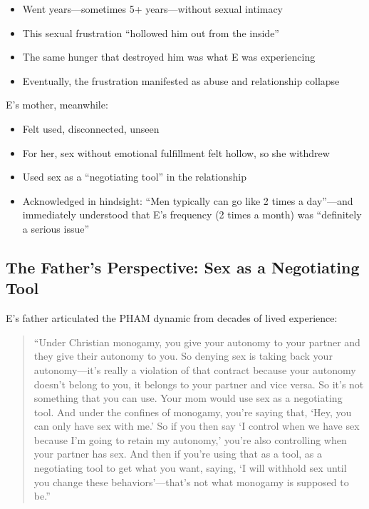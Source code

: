 \documentclass[12pt,openany]{book}
\numberwithin{equation}{chapter}
\begin{document}
\begin{itemize}
    \item Went years---sometimes 5+ years---without sexual intimacy
    \item This sexual frustration ``hollowed him out from the inside''
    \item The same hunger that destroyed him was what E was experiencing
    \item Eventually, the frustration manifested as abuse and relationship collapse
\end{itemize}

E's mother, meanwhile:

\begin{itemize}
    \item Felt used, disconnected, unseen
    \item For her, sex without emotional fulfillment felt hollow, so she withdrew
    \item Used sex as a ``negotiating tool'' in the relationship
    \item Acknowledged in hindsight: ``Men typically can go like 2 times a day''---and immediately understood that E's frequency (2 times a month) was ``definitely a serious issue''
\end{itemize}

\subsection{The Father's Perspective: Sex as a Negotiating Tool}

E's father articulated the PHAM dynamic from decades of lived experience:

\begin{quote}
``Under Christian monogamy, you give your autonomy to your partner and they give their autonomy to you. So denying sex is taking back your autonomy---it's really a violation of that contract because your autonomy doesn't belong to you, it belongs to your partner and vice versa. So it's not something that you can use. Your mom would use sex as a negotiating tool. And under the confines of monogamy, you're saying that, `Hey, you can only have sex with me.' So if you then say `I control when we have sex because I'm going to retain my autonomy,' you're also controlling when your partner has sex. And then if you're using that as a tool, as a negotiating tool to get what you want, saying, `I will withhold sex until you change these behaviors'---that's not what monogamy is supposed to be.''
\end{quote}
\end{document}
